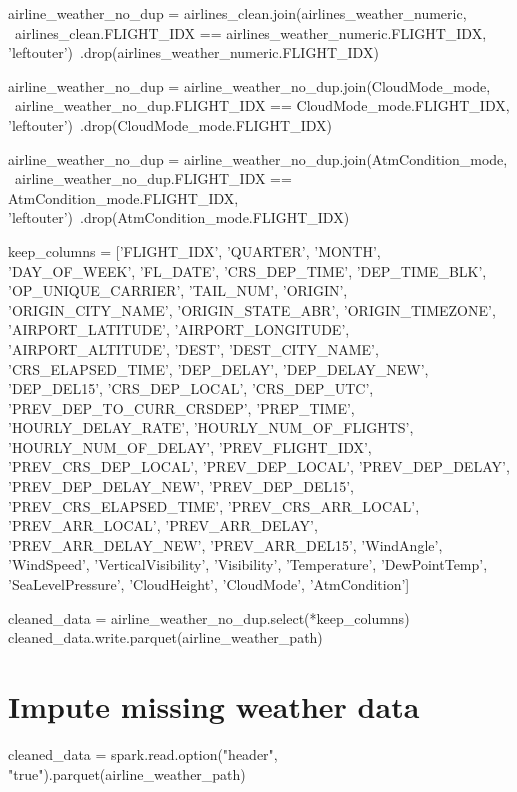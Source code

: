 \documentclass[11pt]{article}
\begin{document}
airline_weather_no_dup = airlines_clean.join(airlines_weather_numeric, \
     airlines_clean.FLIGHT_IDX == airlines_weather_numeric.FLIGHT_IDX, 'leftouter')\
    .drop(airlines_weather_numeric.FLIGHT_IDX)

airline_weather_no_dup = airline_weather_no_dup.join(CloudMode_mode, \
     airline_weather_no_dup.FLIGHT_IDX == CloudMode_mode.FLIGHT_IDX, 'leftouter')\
    .drop(CloudMode_mode.FLIGHT_IDX)

airline_weather_no_dup = airline_weather_no_dup.join(AtmCondition_mode, \
     airline_weather_no_dup.FLIGHT_IDX == AtmCondition_mode.FLIGHT_IDX, 'leftouter')\
    .drop(AtmCondition_mode.FLIGHT_IDX)

keep_columns = ['FLIGHT_IDX', 'QUARTER', 'MONTH', 'DAY_OF_WEEK', 'FL_DATE', 'CRS_DEP_TIME', 'DEP_TIME_BLK', 
                'OP_UNIQUE_CARRIER', 'TAIL_NUM', 'ORIGIN', 'ORIGIN_CITY_NAME', 'ORIGIN_STATE_ABR', 'ORIGIN_TIMEZONE',
                'AIRPORT_LATITUDE', 'AIRPORT_LONGITUDE', 'AIRPORT_ALTITUDE', 'DEST', 'DEST_CITY_NAME', 'CRS_ELAPSED_TIME', 
                'DEP_DELAY', 'DEP_DELAY_NEW', 'DEP_DEL15', 'CRS_DEP_LOCAL', 'CRS_DEP_UTC',
                'PREV_DEP_TO_CURR_CRSDEP', 'PREP_TIME', 'HOURLY_DELAY_RATE', 'HOURLY_NUM_OF_FLIGHTS', 'HOURLY_NUM_OF_DELAY',
                'PREV_FLIGHT_IDX', 'PREV_CRS_DEP_LOCAL', 'PREV_DEP_LOCAL', 'PREV_DEP_DELAY', 'PREV_DEP_DELAY_NEW', 'PREV_DEP_DEL15', 'PREV_CRS_ELAPSED_TIME',
                'PREV_CRS_ARR_LOCAL', 'PREV_ARR_LOCAL', 'PREV_ARR_DELAY', 'PREV_ARR_DELAY_NEW', 'PREV_ARR_DEL15', 
                'WindAngle', 'WindSpeed', 'VerticalVisibility', 'Visibility', 'Temperature', 'DewPointTemp', 'SeaLevelPressure', 'CloudHeight', 'CloudMode', 'AtmCondition']

cleaned_data = airline_weather_no_dup.select(*keep_columns)
cleaned_data.write.parquet(airline_weather_path)
    \hypertarget{impute-missing-weather-data}{%
\section{Impute missing weather
data}\label{impute-missing-weather-data}}
cleaned_data = spark.read.option("header", "true").parquet(airline_weather_path)
\end{document}
